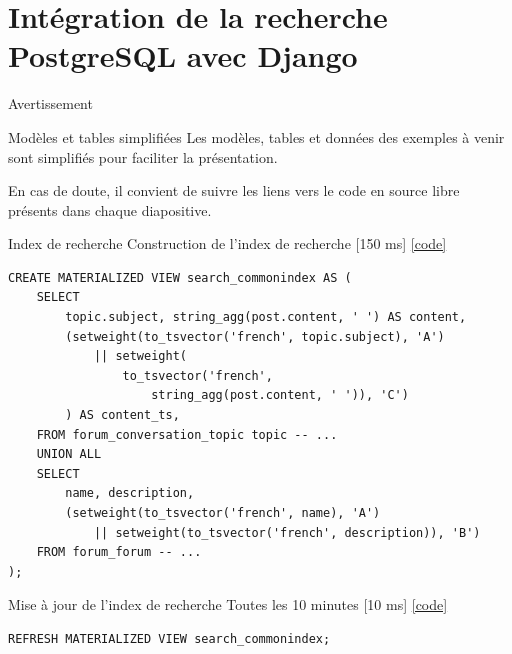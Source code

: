 \documentclass{beamer}
\begin{document}

\section{Intégration de la recherche PostgreSQL avec Django}

\begin{frame}{Avertissement}
    \begin{alertblock}{Modèles et tables simplifiées} Les modèles, tables et
        données des exemples à venir sont simplifiés pour faciliter la
        présentation.\par
        En cas de doute, il convient de suivre les liens vers le
        code en source libre présents dans chaque diapositive.
	\end{alertblock}
\end{frame}

\begin{frame}[fragile]{Index de recherche}
    Construction de l'index de recherche \hfill [150 ms] \href{https://github.com/gip-inclusion/itou-communaute-django/blob/b19e70216affb2e27d38f946ce9a9500ffa7be35/lacommunaute/search/migrations/0001_initial.py}{[code]}
    \begin{verbatim}
CREATE MATERIALIZED VIEW search_commonindex AS (
    SELECT
        topic.subject, string_agg(post.content, ' ') AS content,
        (setweight(to_tsvector('french', topic.subject), 'A')
            || setweight(
                to_tsvector('french',
                    string_agg(post.content, ' ')), 'C')
        ) AS content_ts,
    FROM forum_conversation_topic topic -- ...
    UNION ALL
    SELECT
        name, description,
        (setweight(to_tsvector('french', name), 'A')
            || setweight(to_tsvector('french', description)), 'B')
    FROM forum_forum -- ...
);
    \end{verbatim}
\end{frame}

\begin{frame}[fragile]{Mise à jour de l'index de recherche}
    Toutes les 10 minutes \hfill [10 ms] \href{https://github.com/gip-inclusion/itou-communaute-django/blob/b19e70216affb2e27d38f946ce9a9500ffa7be35/clevercloud/rebuild_index.sh}{[code]}
    \begin{verbatim}
REFRESH MATERIALIZED VIEW search_commonindex;
    \end{verbatim}
\end{frame}
\end{document}

